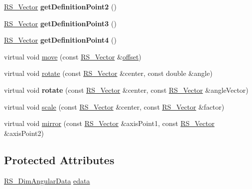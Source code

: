 \begin{DoxyCompactItemize}
\item 
\hypertarget{classRS__DimAngular_acac90880a6237c7e87ffd212742c89c2}{\hyperlink{classRS__Vector}{R\-S\-\_\-\-Vector} {\bfseries get\-Definition\-Point2} ()}\label{classRS__DimAngular_acac90880a6237c7e87ffd212742c89c2}

\item 
\hypertarget{classRS__DimAngular_a7ab253558ad63f8b9505394b85cc5a75}{\hyperlink{classRS__Vector}{R\-S\-\_\-\-Vector} {\bfseries get\-Definition\-Point3} ()}\label{classRS__DimAngular_a7ab253558ad63f8b9505394b85cc5a75}

\item 
\hypertarget{classRS__DimAngular_ac470fc7206c1254c56a7978dcdcb521d}{\hyperlink{classRS__Vector}{R\-S\-\_\-\-Vector} {\bfseries get\-Definition\-Point4} ()}\label{classRS__DimAngular_ac470fc7206c1254c56a7978dcdcb521d}

\item 
virtual void \hyperlink{classRS__DimAngular_a87c6b3390b548935f97fbb9ba8a5bf4e}{move} (const \hyperlink{classRS__Vector}{R\-S\-\_\-\-Vector} \&\hyperlink{classRS__Entity_aa296d21b9aac99161d386ce2f60f0fea}{offset})
\item 
virtual void \hyperlink{classRS__DimAngular_aa39385af9a73e555f5c32cc2fd5afaad}{rotate} (const \hyperlink{classRS__Vector}{R\-S\-\_\-\-Vector} \&center, const double \&angle)
\item 
\hypertarget{classRS__DimAngular_a15c2694b19c7581a9d30b7a4cbdd6bb2}{virtual void {\bfseries rotate} (const \hyperlink{classRS__Vector}{R\-S\-\_\-\-Vector} \&center, const \hyperlink{classRS__Vector}{R\-S\-\_\-\-Vector} \&angle\-Vector)}\label{classRS__DimAngular_a15c2694b19c7581a9d30b7a4cbdd6bb2}

\item 
virtual void \hyperlink{classRS__DimAngular_ae6ef8362510ac89f949a7fe4cc99bfcc}{scale} (const \hyperlink{classRS__Vector}{R\-S\-\_\-\-Vector} \&center, const \hyperlink{classRS__Vector}{R\-S\-\_\-\-Vector} \&factor)
\item 
virtual void \hyperlink{classRS__DimAngular_a10875bfa7dc229e36db6fe602ebe6370}{mirror} (const \hyperlink{classRS__Vector}{R\-S\-\_\-\-Vector} \&axis\-Point1, const \hyperlink{classRS__Vector}{R\-S\-\_\-\-Vector} \&axis\-Point2)
\end{DoxyCompactItemize}
\subsection*{Protected Attributes}
\begin{DoxyCompactItemize}
\item 
\hyperlink{classRS__DimAngularData}{R\-S\-\_\-\-Dim\-Angular\-Data} \hyperlink{classRS__DimAngular_a4b0ff4ac33106ab11ca76a551afa1ca9}{edata}
\end{DoxyCompactItemize}
